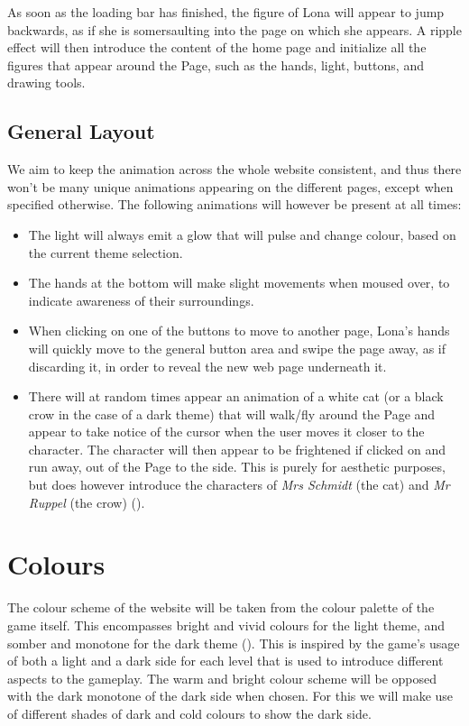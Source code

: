 \documentclass{article}
\begin{document}
\begin{flushleft}
    As soon as the loading bar has finished, the figure of Lona will appear to jump backwards, as if she is somersaulting into the page on which she appears. A ripple effect will then introduce the content of the home page and initialize all the figures that appear around the Page, such as the hands, light, buttons, and drawing tools.

    \subsection{General Layout}
    We aim to keep the animation across the whole website consistent, and thus there won't be many unique animations appearing on the different pages, except when specified otherwise. The following animations will however be present at all times:
    \begin{itemize}
        \item The light will always emit a glow that will pulse and change colour, based on the current theme selection.
        \item The hands at the bottom will make slight movements when moused over, to indicate awareness of their surroundings.
        \item When clicking on one of the buttons to move to another page, Lona's hands will quickly move to the general button area and swipe the page away, as if discarding it, in order to reveal the new web page underneath it.
        \item There will at random times appear an animation of a white cat (or a black crow in the case of a dark theme) that will walk/fly around the Page and appear to take notice of the cursor when the user moves it closer to the character. The character will then appear to be frightened if clicked on and run away, out of the Page to the side. This is purely for aesthetic purposes, but does however introduce the characters of \textit{Mrs Schmidt} (the cat) and \textit{Mr Ruppel} (the crow) (\cite{kickstarter}).
    \end{itemize} 
\end{flushleft}

\section{Colours}
    \begin{flushleft}
    The colour scheme of the website will be taken from the colour palette of the game itself. This encompasses bright and vivid colours for the light theme, and somber and monotone for the dark theme (\cite{kickstarter}). This is inspired by the game's usage of both a light and a dark side for each level that is used to introduce different aspects to the gameplay. The warm and bright colour scheme will be opposed with the dark monotone of the dark side when chosen. For this we will make use of different shades of dark and cold colours to show the dark side.
    \end{flushleft}
\end{document}
